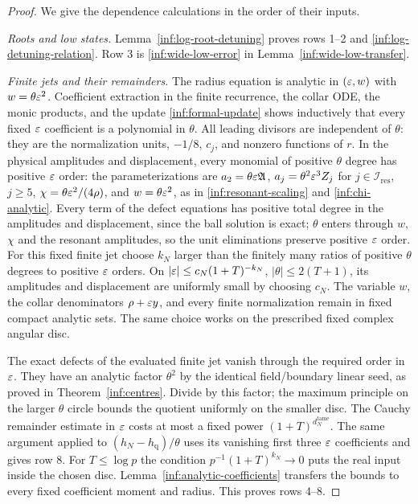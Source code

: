 \begin{proof}
We give the dependence calculations in the order of their inputs.

\emph{Roots and low states.}
Lemma~\ref{inf:log-root-detuning} proves rows 1--2 and
\eqref{inf:log-detuning-relation}. Row 3 is
\eqref{inf:wide-low-error} in Lemma~\ref{inf:wide-low-transfer}.

\emph{Finite jets and their remainders.}
The radius equation is analytic in $(\varepsilon,w)$ with
$w=\theta\varepsilon^2$. Coefficient extraction in the finite recurrence,
the collar ODE, the monic products, and the update
\eqref{inf:formal-update} shows inductively that every fixed
$\varepsilon$ coefficient is a polynomial in $\theta$.
All leading divisors are independent of $\theta$: they are the
normalization units, $-1/8$, $c_j$, and nonzero functions of $r$.
In the physical amplitudes and displacement, every monomial of
positive $\theta$ degree has positive $\varepsilon$ order: the
parameterizations are $a_2=\theta\varepsilon\mathfrak A$,
$a_j=\theta^2\varepsilon^3Z_j$ for $j\in\mathcal I_{\mathrm{res}}$, $j\ge5$,
$\chi=\theta\varepsilon^2/(4\rho)$, and $w=\theta\varepsilon^2$, as in
\eqref{inf:resonant-scaling} and \eqref{inf:chi-analytic}.
Every term of the defect equations has positive total degree in the
amplitudes and displacement, since the ball solution is exact;
$\theta$ enters through $w$, $\chi$ and the resonant amplitudes,
so the unit eliminations preserve positive $\varepsilon$ order.
For this fixed finite jet choose $k_N$ larger than the finitely
many ratios of positive $\theta$ degrees to positive $\varepsilon$ orders.
On $|\varepsilon|\le c_N(1+T)^{-k_N}$, $|\theta|\le2(T+1)$, its
amplitudes and displacement are uniformly small by choosing $c_N$.
The variable $w$, the collar denominators $\rho+\varepsilon y$, and every
finite normalization remain in fixed compact analytic sets.
The same choice works on the prescribed fixed complex angular disc.

The exact defects of the evaluated finite jet vanish through the
required order in $\varepsilon$. They have an analytic factor $\theta^2$
by the identical field/boundary linear seed, as proved in
Theorem~\ref{inf:centres}. Divide by this factor; the maximum
principle on the larger $\theta$ circle bounds the quotient
uniformly on the smaller disc. The Cauchy remainder estimate in
$\varepsilon$ costs at most a fixed power $(1+T)^{d_N^{\mathrm{tame}}}$.
The same argument applied to $(h_N-h_{\mathrm q})/\theta$ uses its
vanishing first three $\varepsilon$ coefficients and gives row 8.
For $T\le\log p$ the condition
$p^{-1}(1+T)^{k_N}\to0$ puts the real input inside the chosen disc.
Lemma~\ref{inf:analytic-coefficients} transfers the bounds to every
fixed coefficient moment and radius. This proves rows 4--8.


\end{proof}
